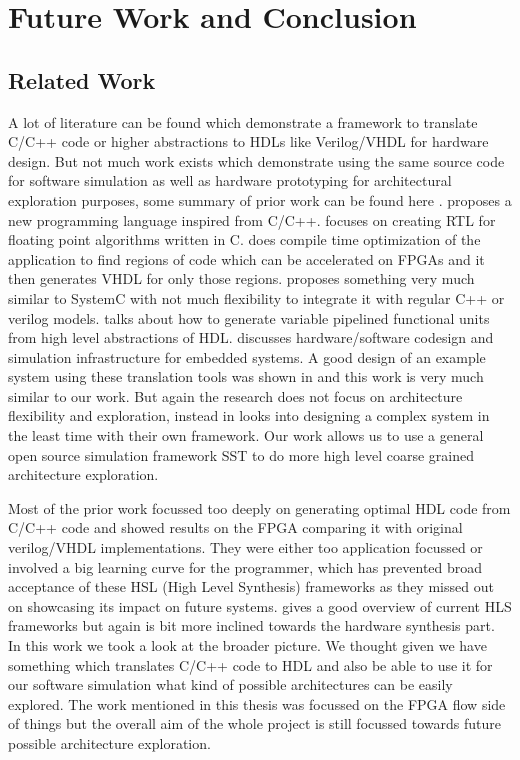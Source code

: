 \setcounter{equation}{0}

\chapter{Future Work and Conclusion }
\label{Future Work and Conclusion }
\section{Related Work}
 A lot of literature can be found which demonstrate a framework to translate C/C++ code or higher abstractions to HDLs like Verilog/VHDL for hardware design. But not much work exists which demonstrate using the same source code for software simulation as well as hardware prototyping for architectural exploration purposes, some summary of prior work can be found here \cite{hls_overview}. \cite{SAC} proposes a new programming language inspired from C/C++. \cite{trident} focuses on creating RTL for floating point algorithms written in C. \cite{ROCC} does compile time optimization of the application to find regions of code which can be accelerated on FPGAs and it then generates VHDL for only those regions. \cite{reactivity} proposes something very much similar to SystemC with not much flexibility to integrate it with regular C++ or verilog models. \cite{hls_pipeline} talks about how to generate variable pipelined functional units from high level abstractions of HDL. \cite{hadi_dcim} discusses hardware/software codesign and simulation infrastructure for embedded systems. A good design of an example system using these translation tools was shown in \cite{piranha} and this work is very much similar to our work. But again the research does not focus on architecture flexibility and exploration, instead in looks into designing a complex system in the least time with their own framework. Our work allows us to use a general open source simulation framework SST \cite{SST} to do more high level coarse grained architecture exploration.
 
Most of the prior work focussed too deeply on generating optimal HDL code from C/C++ code and showed results on the FPGA comparing it with original verilog/VHDL implementations. They were either too application focussed or  involved a big learning curve for the programmer, which has prevented broad acceptance of these HSL (High Level Synthesis) frameworks as they missed out on showcasing its impact on future systems. \cite{hls_overview} gives a good overview of current HLS frameworks but again is bit more inclined towards the hardware synthesis part. In this work we took a look at the broader picture. We thought given we have something which translates C/C++ code to HDL and also be able to use it for our software simulation what kind of possible architectures can be easily explored. The work mentioned in this thesis was focussed on the FPGA flow side of things but the overall aim of the whole project is still focussed towards future possible architecture exploration.

